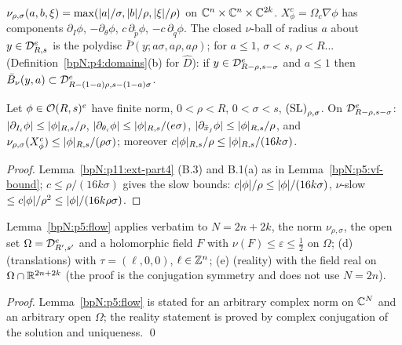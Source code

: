 \begin{definition}\label{bpN:p11:scaled}
$\nu_{\rho,\sigma}(a,b,\xi)=\max(\lvert a\rvert/\sigma,\lvert b\rvert/\rho,\lvert \xi\rvert/\rho)$ on $\mathbb{C}^n\times\mathbb{C}^n\times\mathbb{C}^{2k}$. $X^c_\phi=\Omega_c\nabla\phi$ has components $\partial_I\phi$, $-\partial_\theta\phi$, $c\,\partial_{\tilde p}\phi$, $-c\,\partial_{\tilde q}\phi$. The closed $\nu$-ball of radius $a$ about $y\in\mathcal D_{R,s}^e$ is the polydisc $\bar P(y;a\sigma,a\rho,a\rho)$; for $a\le1$, $\sigma<s$, $\rho<R$... (Definition~\ref{bpN:p4:domains}(b) for $\hat D$): if $y\in\mathcal D_{R-\rho,s-\sigma}^e$ and $a\le1$ then $\bar B_\nu(y,a)\subset\mathcal D_{R-(1-a)\rho,s-(1-a)\sigma}^e$.
\end{definition}

\begin{lemma}\label{bpN:p11:vf}
Let $\phi\in\mathcal O(R,s)^e$ have finite norm, $0<\rho<R$, $0<\sigma<s$, $\textup{(SL)}_{\rho,\sigma}$. On $\mathcal D_{R-\rho,s-\sigma}^e$: $\lvert \partial_{I_i}\phi\rvert\le\lvert \phi\rvert_{R,s}/\rho$, $\lvert \partial_{\theta_i}\phi\rvert\le\lvert \phi\rvert_{R,s}/(e\sigma)$, $\lvert \partial_{\tilde x_j}\phi\rvert\le\lvert \phi\rvert_{R,s}/\rho$, and $\nu_{\rho,\sigma}(X^c_\phi)\le\lvert \phi\rvert_{R,s}/(\rho\sigma)$; moreover $c\lvert \phi\rvert_{R,s}/\rho\le\lvert \phi\rvert_{R,s}/(16k\sigma)$.
\end{lemma}
\begin{proof}
Lemma~\ref{bpN:p11:ext-part4} (B.3) and B.1(a) as in Lemma~\ref{bpN:p5:vf-bound}; $c\le\rho/(16k\sigma)$ gives the slow bounds: $c\lvert \phi\rvert/\rho\le\lvert \phi\rvert/(16k\sigma)$, $\nu$-slow $\le c\lvert \phi\rvert/\rho^2\le\lvert \phi\rvert/(16k\rho\sigma)$.
\end{proof}

\begin{lemma}\label{bpN:p11:flow}
Lemma~\ref{bpN:p5:flow} applies verbatim to $N=2n+2k$, the norm $\nu_{\rho,\sigma}$, the open set $\Omega=\mathcal D_{R',s'}^e$ and a holomorphic field $F$ with $\nu(F)\le\varepsilon\le\frac12$ on $\Omega$; (d) (translations) with $\tau=(\ell,0,0)$, $\ell\in\mathbb{Z}^n$; (e) (reality) with the field real on $\Omega\cap\mathbb{R}^{2n+2k}$ (the proof is the conjugation symmetry and does not use $N=2n$).
\end{lemma}
\begin{proof}
Lemma~\ref{bpN:p5:flow} is stated for an arbitrary complex norm on $\mathbb{C}^N$ and an arbitrary open $\Omega$; the reality statement is proved by complex conjugation of the solution and uniqueness. \qed
\end{proof}

